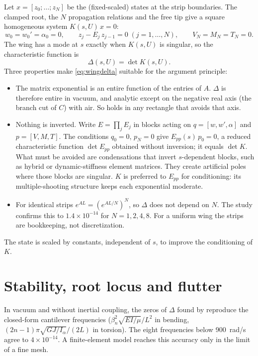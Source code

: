 Let $x=[z_0;\dots;z_N]$ be the (fixed-scaled) states at the strip
boundaries. The clamped root, the $N$ propagation relations and the free tip
give a square homogeneous system $K(s,U)\,x=0$:
\begin{equation}
  w_0=w_0'=\alpha_0=0,\qquad z_{j}-E_j\,z_{j-1}=0\;(j=1,\dots,N),\qquad
  V_N=M_N=T_N=0.
\end{equation}
The wing has a mode at $s$ exactly when $K(s,U)$ is singular, so the
characteristic function is
\begin{equation}
  \Delta(s,U)=\det K(s,U).
  \label{eq:wingdelta}
\end{equation}
Three properties make \eqref{eq:wingdelta} suitable for the argument
principle:
\begin{itemize}
  \item The matrix exponential is an entire function of the entries of
        $A$. $\Delta$ is therefore entire in vacuum, and analytic except on
        the negative real axis (the branch cut of $C$) with air. So
         holds in any rectangle that avoids that axis.
  \item Nothing is inverted. Write $E=\prod_jE_j$ in blocks acting on
        $q=[w,w',\alpha]$ and $p=[V,M,T]$. The conditions $q_0=0$,
        $p_N=0$ give $E_{pp}(s)\,p_0=0$, a reduced characteristic function
        $\det E_{pp}$ obtained without inversion; it equals $\det K$. What
        must be avoided are condensations that invert $s$-dependent blocks,
        such as hybrid or dynamic-stiffness element matrices. They create
        artificial poles where those blocks are singular. $K$ is preferred
        to $E_{pp}$ for conditioning: its multiple-shooting structure keeps
        each exponential moderate.
  \item For identical strips $e^{AL}=(e^{AL/N})^N$, so $\Delta$ does not
        depend on $N$. The study confirms this to $1.4\times10^{-14}$ for
        $N=1,2,4,8$. For a uniform wing the strips are bookkeeping, not
        discretization.
\end{itemize}
The state is scaled by constants, independent of $s$, to improve the
conditioning of $K$.

\section{Stability, root locus and flutter}

In vacuum and without inertial coupling, the zeros of $\Delta$ found by
 reproduce the closed-form cantilever frequencies
($\beta_n^2\sqrt{EI/\mu}/L^2$ in bending, $(2n-1)\pi\sqrt{GJ/I_\alpha}/(2L)$
in torsion). The eight frequencies below 900~rad/s agree to
$4\times10^{-14}$. A finite-element model reaches this accuracy only in the
limit of a fine mesh.

